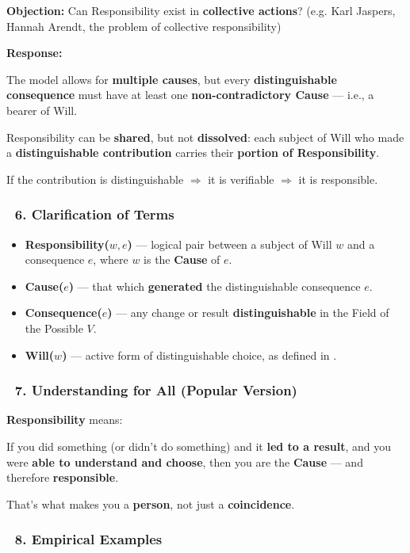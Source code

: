 \documentclass[12pt]{article}
\begin{document}
\bigskip

\textbf{Objection:} Can Responsibility exist in \textbf{collective actions}? (e.g. Karl Jaspers, Hannah Arendt, the problem of collective responsibility)

\textbf{Response:}

The model allows for \textbf{multiple causes}, but every \textbf{distinguishable consequence} must have at least one \textbf{non-contradictory Cause} — i.e., a bearer of Will.

Responsibility can be \textbf{shared}, but not \textbf{dissolved}: each subject of Will who made a \textbf{distinguishable contribution} carries their \textbf{portion of Responsibility}.

If the contribution is distinguishable $\Rightarrow$ it is verifiable $\Rightarrow$ it is responsible.

\subsubsection*{🔹 6. Clarification of Terms}

\begin{itemize}
\item \textbf{Responsibility($w, e$)} — logical pair between a subject of Will $w$ and a consequence $e$, where $w$ is the \textbf{Cause} of $e$.
\item \textbf{Cause($e$)} — that which \textbf{generated} the distinguishable consequence $e$.
\item \textbf{Consequence($e$)} — any change or result \textbf{distinguishable} in the Field of the Possible $V$.
\item \textbf{Will($w$)} — active form of distinguishable choice, as defined in \text{[10.6]}.
\end{itemize}

\subsubsection*{🔹 7. Understanding for All (Popular Version)}

\textbf{Responsibility} means:

If you did something (or didn’t do something) and it \textbf{led to a result}, and you were \textbf{able to understand and choose}, then you are the \textbf{Cause} — and therefore \textbf{responsible}.

That’s what makes you a \textbf{person}, not just a \textbf{coincidence}.

\subsubsection*{🔹 8. Empirical Examples}
\end{document}
